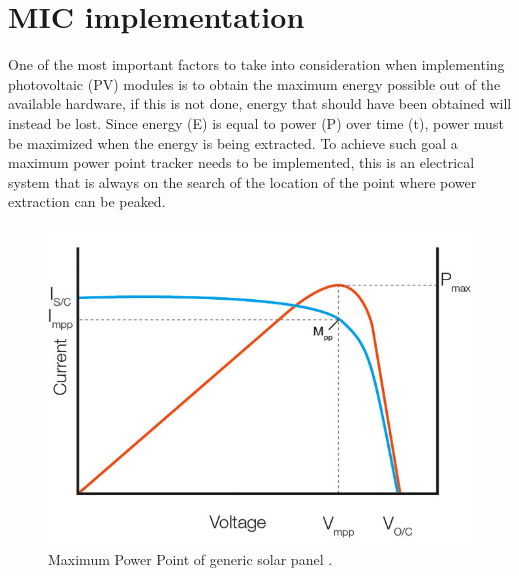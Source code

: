 
\section{MIC implementation}
One of the most important factors to take into consideration when implementing photovoltaic (PV) modules is to obtain the maximum energy possible out of the available hardware, if this is not done, energy that should have been obtained will instead be lost. Since energy (E) is equal to power (P) over time (t), power must be maximized when the energy is being extracted. To achieve such goal a maximum power point tracker needs to be implemented, this is an electrical system that is always on the search of the location of the point where power extraction can be peaked. 
\begin{figure}[htbp]
	\begin{center}
		\includegraphics[width=0.6\linewidth]{../Pictures/mpp_graph.jpg}
		\caption{Maximum Power Point of generic solar panel \cite{MICintro}.}
		\label{fig:mpp}
	\end{center}
\end{figure}


